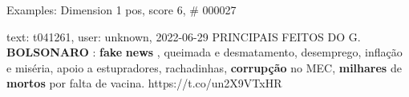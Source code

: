 \begin{frame}{Examples: Dimension 1 pos, score 6, \# 000027}
\footnotesize
\begin{exampleblock}{text: t041261, user: unknown, 2022-06-29}
PRINCIPAIS FEITOS DO G. \textbf{BOLSONARO} : \textbf{fake} \textbf{news} , 
queimada e desmatamento, desemprego, inflação e miséria, apoio a estupradores, 
rachadinhas, \textbf{corrupção} no MEC, \textbf{milhares} de \textbf{mortos} 
por falta de vacina. https://t.co/un2X9VTxHR 
\end{exampleblock}
\end{frame}
